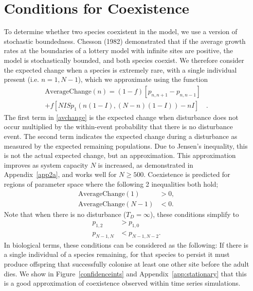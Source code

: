 \documentclass[a4paper]{article}
\begin{document}
\section{Conditions for Coexistence}
To determine whether two species coexistent in the model, we use a version of stochastic boundedness. Chesson (1982) demonstrated that if the average growth rates at the boundaries of a lottery model with infinite sites are positive, the model is stochastically bounded, and both species coexist. We therefore consider the expected change when a species is extremely rare, with a single individual present (i.e. $n=1,N-1$), which we approximate using the function
\begin{equation}
\label{avchange}
\begin{array}{rl}
\text{AverageChange}(n) = (1-f)\left[p_{n,n+1}-p_{n,n-1}\right]&\\[0.75em]
+ f\left[ NI Sp_1(n(1-I),(N-n)(1-I)) - nI\right]&.
\end{array}
\end{equation}
The first term in \eqref{avchange} is the expected change when disturbance does not occur multiplied by the within-event probability that there is no disturbance event. The second term indicates the expected change during a disturbance as measured by the expected remaining populations. Due to Jensen's inequality, this is not the actual expected change, but an approximation. This approximation improves as system capacity $N$ is increased, as demonstrated in Appendix~\ref{app2a}, and works well for $N\geq500$. Coexistence is predicted for regions of parameter space where the following 2 inequalities both hold;
\begin{align}
\label{ac1}\text{AverageChange}(1)&>0, \\
\label{acn-1}\text{AverageChange}(N-1)&<0. \end{align}
Note that when there is no disturbance ($T_D=\infty$), these conditions simplify to 
\begin{align}
\label{lowerboundarycond}p_{1,2} &>p_{1,0} \\
\label{upperboundarycond}p_{N-1,N} &<p_{N-1,N-2}. \end{align}
In biological terms, these conditions can be considered as the following: If there is a single individual of a species remaining, for that species to persist it must produce offspring that successfully colonise at least one other site before the adult dies. We show in Figure~\ref{confidenceints} and Appendix~\ref{app:stationary} that this is a good approximation of coexistence observed within time series simulations.
\end{document}
